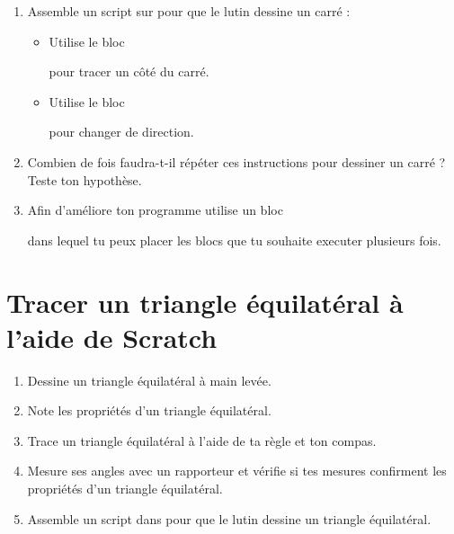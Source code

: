 \begin{enumerate} 
    \item Assemble un script sur \Scratch pour que le lutin dessine un carré : 
    \begin{itemize} 
        \item Utilise le bloc
        \begin{scratch}  \end{scratch}
        pour tracer un côté du carré. 
        \item Utilise le bloc
        \begin{scratch}  \end{scratch}
        pour changer de direction. 
    \end{itemize}


    \item Combien de fois faudra-t-il répéter ces instructions pour dessiner un carré ? Teste ton hypothèse. 
    \item Afin d'améliore ton programme utilise un bloc
    \begin{scratch}  \end{scratch}
    dans lequel tu peux placer les blocs que tu souhaite executer plusieurs fois.
\end{enumerate}

\section{Tracer un triangle équilatéral à l'aide de Scratch} 

\begin{enumerate}
    \item Dessine un triangle équilatéral à main levée.
    \item Note les propriétés d'un triangle équilatéral.
    \item Trace un triangle équilatéral à l'aide de ta règle et ton compas.
    \item Mesure ses angles avec un rapporteur et vérifie si tes mesures confirment les propriétés d'un triangle équilatéral.
    \item Assemble un script dans \Scratch{} pour que le lutin dessine un triangle équilatéral.
\end{enumerate}
